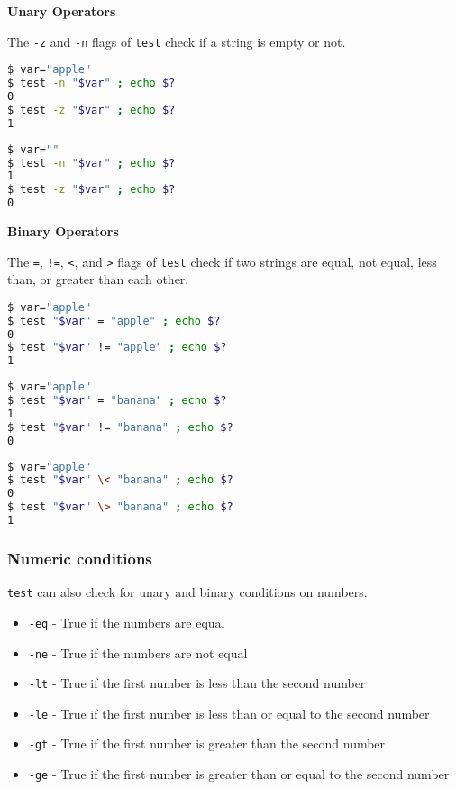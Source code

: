 \textbf{Unary Operators}

The \lstinline|-z| and \lstinline|-n| flags of \lstinline|test| check if a string is empty or not.

\begin{lstlisting}[language=bash]
$ var="apple"
$ test -n "$var" ; echo $?
0
$ test -z "$var" ; echo $?
1
\end{lstlisting}

\begin{lstlisting}[language=bash]
$ var=""
$ test -n "$var" ; echo $?
1
$ test -z "$var" ; echo $?
0
\end{lstlisting}

\textbf{Binary Operators}

The \lstinline|=|, \lstinline|!=|, \lstinline|<|, and \lstinline|>| flags of \lstinline|test| check if two strings are equal, not equal, less than, or greater than each other.

\begin{lstlisting}[language=bash]
$ var="apple"
$ test "$var" = "apple" ; echo $?
0
$ test "$var" != "apple" ; echo $?
1
\end{lstlisting}

\begin{lstlisting}[language=bash]
$ var="apple"
$ test "$var" = "banana" ; echo $?
1
$ test "$var" != "banana" ; echo $?
0
\end{lstlisting}

\begin{lstlisting}[language=bash]
$ var="apple"
$ test "$var" \< "banana" ; echo $?
0
$ test "$var" \> "banana" ; echo $?
1
\end{lstlisting}

\subsubsection{Numeric conditions}

\lstinline|test| can also check for unary and binary conditions on numbers.

\begin{itemize}
    \item \lstinline|-eq| - True if the numbers are equal
    \item \lstinline|-ne| - True if the numbers are not equal
    \item \lstinline|-lt| - True if the first number is less than the second number
    \item \lstinline|-le| - True if the first number is less than or equal to the second number
    \item \lstinline|-gt| - True if the first number is greater than the second number
    \item \lstinline|-ge| - True if the first number is greater than or equal to the second number
\end{itemize}


